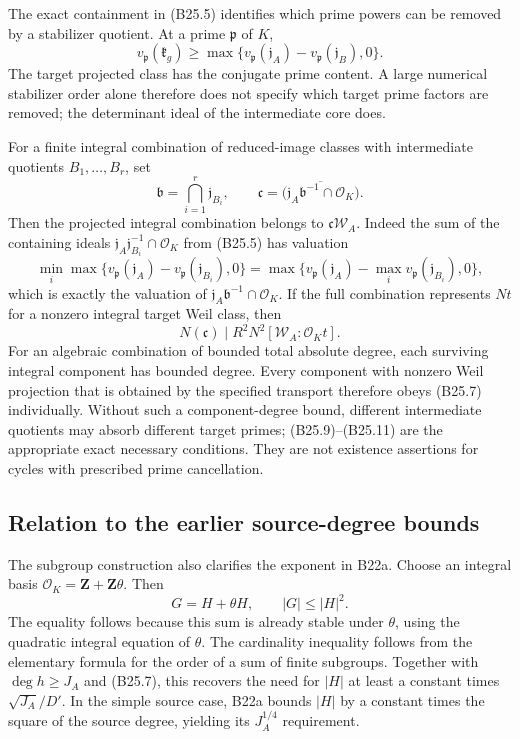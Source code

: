 The exact containment in (B25.5) identifies which prime powers can be removed by a stabilizer quotient. At a prime \(\mathfrak p\) of \(K\), \[
 v_{\mathfrak p}(\mathfrak k_g)
 \ge\max\{v_{\mathfrak p}(\mathfrak j_A)
              -v_{\mathfrak p}(\mathfrak j_B),0\}.
\tag{B25.9}
\] The target projected class has the conjugate prime content. A large numerical stabilizer order alone therefore does not specify which target prime factors are removed; the determinant ideal of the intermediate core does.

For a finite integral combination of reduced-image classes with intermediate quotients \(B_1,\ldots,B_r\), set \[
 \mathfrak b=\bigcap_{i=1}^r\mathfrak j_{B_i},
 \qquad
 \mathfrak c=\overline{\bigl(\mathfrak j_A\mathfrak b^{-1}
                                      \cap\mathcal O_K\bigr)}.
\tag{B25.10}
\] Then the projected integral combination belongs to \(\mathfrak c\mathscr W_A\). Indeed the sum of the containing ideals \(\mathfrak j_A\mathfrak j_{B_i}^{-1}\cap\mathcal O_K\) from (B25.5) has valuation \[
 \min_i\max\{v_{\mathfrak p}(\mathfrak j_A)
                    -v_{\mathfrak p}(\mathfrak j_{B_i}),0\}
 =\max\{v_{\mathfrak p}(\mathfrak j_A)
                    -\max_i v_{\mathfrak p}(\mathfrak j_{B_i}),0\},
\] which is exactly the valuation of \(\mathfrak j_A\mathfrak b^{-1}\cap\mathcal O_K\). If the full combination represents \(Nt\) for a nonzero integral target Weil class, then \[
 N(\mathfrak c)\mid R^2N^2[\mathscr W_A:\mathcal O_Kt].
\tag{B25.11}
\] For an algebraic combination of bounded total absolute degree, each surviving integral component has bounded degree. Every component with nonzero Weil projection that is obtained by the specified transport therefore obeys (B25.7) individually. Without such a component-degree bound, different intermediate quotients may absorb different target primes; (B25.9)--(B25.11) are the appropriate exact necessary conditions. They are not existence assertions for cycles with prescribed prime cancellation.

\subsection{Relation to the earlier source-degree bounds}\label{relation-to-the-earlier-source-degree-bounds}

The subgroup construction also clarifies the exponent in B22a. Choose an integral basis \(\mathcal O_K=\mathbf Z+\mathbf Z\theta\). Then \[
 G=H+\theta H,\qquad |G|\le|H|^2.
\tag{B25.12}
\] The equality follows because this sum is already stable under \(\theta\), using the quadratic integral equation of \(\theta\). The cardinality inequality follows from the elementary formula for the order of a sum of finite subgroups. Together with \(\deg h\ge J_A\) and (B25.7), this recovers the need for \(|H|\) at least a constant times \(\sqrt{J_A}/D'\). In the simple source case, B22a bounds \(|H|\) by a constant times the square of the source degree, yielding its \(J_A^{1/4}\) requirement.


